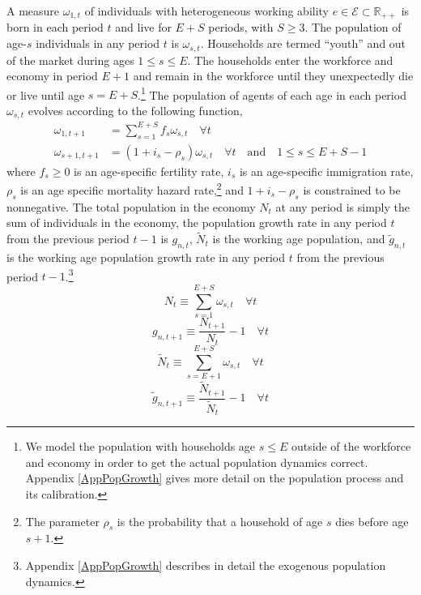 \documentclass[letterpaper,12pt]{article}
\theoremstyle{definition}
\begin{document}
\begin{spacing}{1.5}
    A measure $\omega_{1,t}$ of individuals with heterogeneous working ability $e \in\mathcal{E}\subset\mathbb{R}_{++}$ is born in each period $t$ and live for $E+S$ periods, with $S\geq 3$. The population of age-$s$ individuals in any period $t$ is $\omega_{s,t}$. Households are termed ``youth'' and out of the market during ages $1\leq s\leq E$. The households enter the workforce and economy in period $E+1$ and remain in the workforce until they unexpectedly die or live until age $s=E+S$.\footnote{We model the population with households age $s\leq E$ outside of the workforce and economy in order to get the actual population dynamics correct. Appendix \ref{AppPopGrowth} gives more detail on the population process and its calibration.} The population of agents of each age in each period $\omega_{s,t}$ evolves according to the following function,
    \begin{equation}\label{EqPopLawofmotion}
      \begin{split}
        \omega_{1,t+1} &= \sum_{s=1}^{E+S} f_s\omega_{s,t}\quad\forall t \\
        \omega_{s+1,t+1} &= (1 + i_s - \rho_s)\omega_{s,t}\quad\forall t\quad\text{and}\quad 1\leq s \leq E+S-1
      \end{split}
    \end{equation}
    where $f_s\geq 0$ is an age-specific fertility rate, $i_s$ is an age-specific immigration rate, $\rho_s$ is an age specific mortality hazard rate,\footnote{The parameter $\rho_s$ is the probability that a household of age $s$ dies before age $s+1$.} and $1+i_s-\rho_s$ is constrained to be nonnegative. The total population in the economy $N_t$ at any period is simply the sum of individuals in the economy, the population growth rate in any period $t$ from the previous period $t-1$ is $g_{n,t}$, $\tilde{N}_t$ is the working age population, and $\tilde{g}_{n,t}$ is the working age population growth rate in any period $t$ from the previous period $t-1$.\footnote{Appendix \ref{AppPopGrowth} describes in detail the exogenous population dynamics.}
    \begin{equation}\label{EqPopDef}
      N_t\equiv\sum_{s=1}^{E+S} \omega_{s,t} \quad\forall t
    \end{equation}
    \begin{equation}\label{EqPopGrowth}
      g_{n,t+1} \equiv \frac{N_{t+1}}{N_t} - 1 \quad\forall t
    \end{equation}
    \begin{equation}\label{EqPopWkDef}
      \tilde{N}_t\equiv\sum_{s=E+1}^{E+S} \omega_{s,t} \quad\forall t
    \end{equation}
    \begin{equation}\label{EqPopWkGrowth}
      \tilde{g}_{n,t+1} \equiv \frac{\tilde{N}_{t+1}}{\tilde{N}_t} - 1 \quad\forall t
    \end{equation}



\end{spacing}
\end{document}
